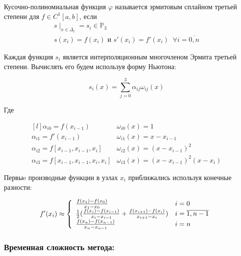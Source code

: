Кусочно-полиномиальная функция $\varphi$ называется эрмитовым сплайном третьей степени для $f \in C^1[a, b]$, если
\begin{equation}
  \begin{gathered}
    s\mid_{x\in \Delta_i} = s_i \in \mathbb{P}_3 \\
      s(x_i) = f(x_i) \text{ и } s'(x_i) = f'(x_i) \;\; \forall i = \overline{0,n}
  \end{gathered}
\end{equation}

Каждая функция $s_i$ является интерполяционным многочленом Эрмита третьей степени. Вычислять его будем используя форму Ньютона:

\begin{equation}
  s_i(x) = \sum_{j=0}^3 \alpha_{ij} \omega_{ij}(x)
\end{equation}

\noindent Где

\begin{equation}
  \begin{matrix*}[l]
    \alpha_{i0} = f(x_{i-1}) & \omega_{i0}(x) = 1\\
    \alpha_{i1} = f'(x_{i-1}) & \omega_{i1}(x) = x - x_{i-1} \\
    \alpha_{i2} = f[x_{i-1}, x_{i-1}, x_i] & \omega_{i2}(x) = (x - x_{i-1})^2 \\
    \alpha_{i3} = f[x_{i-1}, x_{i-1}, x_i, x_i] & \omega_{i3}(x) =  (x - x_{i-1})^2(x-x_i)
  \end{matrix*}
\end{equation}

\noindent Первыe производные функции в узлах $x_i$ приближались используя конечные разности:

\begin{equation}
  f'(x_i) \approx \left\{
  \begin{array}{l l}
    \frac{f(x_1) - f(x_0)}{x_1 - x_0} & i = 0 \\
    \frac{1}{2}(\frac{f(x_i) - f(x_{i-1})}{x_i - x_{i-1}} + \frac{f(x_{i+1}) - f(x_i)}{x_{i+1} - x_i}) & i = \overline{1, n-1} \\
    \frac{f(x_n) - f(x_{n-1})}{x_n - x_{n-1}} & i = n
  \end{array}
  \right.
\end{equation}

\subsubsection{Временная сложность метода:}

